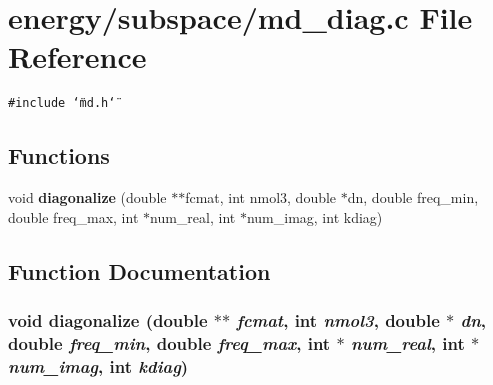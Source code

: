 \section{energy/subspace/md\_\-diag.c File Reference}
\label{md__diag_8c}
{\tt \#include \char`\"{}md.h\char`\"{}}\par
\subsection*{Functions}
\begin{CompactItemize}
\item 
void {\bf diagonalize} (double $\ast$$\ast$fcmat, int nmol3, double $\ast$dn, double freq\_\-min, double freq\_\-max, int $\ast$num\_\-real, int $\ast$num\_\-imag, int kdiag)
\end{CompactItemize}


\subsection{Function Documentation}
\subsubsection{\setlength{\rightskip}{0pt plus 5cm}void diagonalize (double $\ast$$\ast$ {\em fcmat}, int {\em nmol3}, double $\ast$ {\em dn}, double {\em freq\_\-min}, double {\em freq\_\-max}, int $\ast$ {\em num\_\-real}, int $\ast$ {\em num\_\-imag}, int {\em kdiag})}\label{md__diag_8c_7ad98be61a35bd7273506bd42831d9db}


